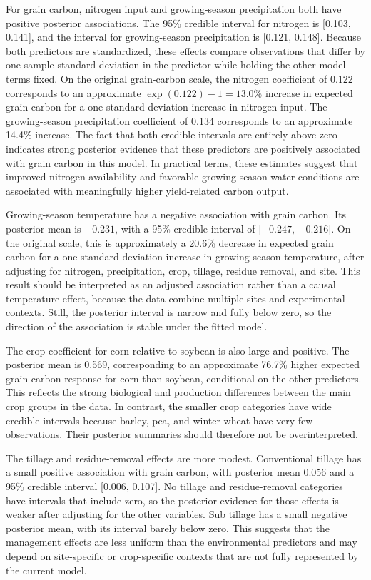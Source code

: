 \documentclass[11pt]{article}
\begin{document}
For grain carbon, nitrogen input and growing-season precipitation both have positive posterior associations. The 95\% credible interval for nitrogen is [0.103, 0.141], and the interval for growing-season precipitation is [0.121, 0.148]. Because both predictors are standardized, these effects compare observations that differ by one sample standard deviation in the predictor while holding the other model terms fixed. On the original grain-carbon scale, the nitrogen coefficient of 0.122 corresponds to an approximate $\exp(0.122)-1=13.0\%$ increase in expected grain carbon for a one-standard-deviation increase in nitrogen input. The growing-season precipitation coefficient of 0.134 corresponds to an approximate 14.4\% increase. The fact that both credible intervals are entirely above zero indicates strong posterior evidence that these predictors are positively associated with grain carbon in this model. In practical terms, these estimates suggest that improved nitrogen availability and favorable growing-season water conditions are associated with meaningfully higher yield-related carbon output.

Growing-season temperature has a negative association with grain carbon. Its posterior mean is $-0.231$, with a 95\% credible interval of [$-0.247$, $-0.216$]. On the original scale, this is approximately a 20.6\% decrease in expected grain carbon for a one-standard-deviation increase in growing-season temperature, after adjusting for nitrogen, precipitation, crop, tillage, residue removal, and site. This result should be interpreted as an adjusted association rather than a causal temperature effect, because the data combine multiple sites and experimental contexts. Still, the posterior interval is narrow and fully below zero, so the direction of the association is stable under the fitted model.

The crop coefficient for corn relative to soybean is also large and positive. The posterior mean is 0.569, corresponding to an approximate 76.7\% higher expected grain-carbon response for corn than soybean, conditional on the other predictors. This reflects the strong biological and production differences between the main crop groups in the data. In contrast, the smaller crop categories have wide credible intervals because barley, pea, and winter wheat have very few observations. Their posterior summaries should therefore not be overinterpreted.

The tillage and residue-removal effects are more modest. Conventional tillage has a small positive association with grain carbon, with posterior mean 0.056 and a 95\% credible interval [0.006, 0.107]. No tillage and residue-removal categories have intervals that include zero, so the posterior evidence for those effects is weaker after adjusting for the other variables. Sub tillage has a small negative posterior mean, with its interval barely below zero. This suggests that the management effects are less uniform than the environmental predictors and may depend on site-specific or crop-specific contexts that are not fully represented by the current model.
\end{document}
